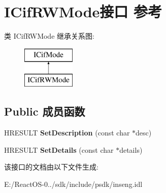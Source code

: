 \hypertarget{interface_i_cif_r_w_mode}{}\section{I\+Cif\+R\+W\+Mode接口 参考}
\label{interface_i_cif_r_w_mode}
类 I\+Cif\+R\+W\+Mode 继承关系图\+:\begin{figure}[H]
\begin{center}
\leavevmode
\includegraphics[height=2.000000cm]{interface_i_cif_r_w_mode}
\end{center}
\end{figure}
\subsection*{Public 成员函数}
\begin{DoxyCompactItemize}
\item 
\mbox{\label{interface_i_cif_r_w_mode_a608b8526efc0efbf85e29dfb63436a2a}} 
H\+R\+E\+S\+U\+LT {\bfseries Set\+Description} (const char $\ast$desc)
\item 
\mbox{\label{interface_i_cif_r_w_mode_a6447bdbfaaf23845802790af2c5ecc0c}} 
H\+R\+E\+S\+U\+LT {\bfseries Set\+Details} (const char $\ast$details)
\end{DoxyCompactItemize}


该接口的文档由以下文件生成\+:\begin{DoxyCompactItemize}
\item 
E\+:/\+React\+O\+S-\/0../sdk/include/psdk/inseng.\+idl\end{DoxyCompactItemize}
